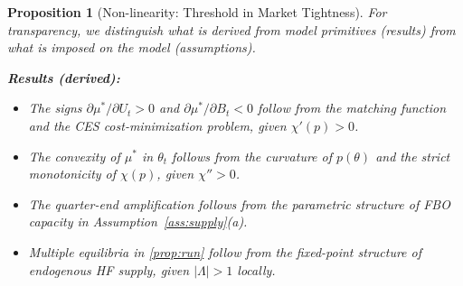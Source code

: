 \documentclass[12pt]{article}
\newtheorem{proposition}{Proposition}
\theoremstyle{definition}
\newcommand{\1}[1]{\mathds{1}\left[#1\right]}
\begin{document}
\begin{proposition}[Non-linearity: Threshold in Market Tightness]
For transparency, we distinguish what is derived from model primitives (results)
from what is imposed on the model (assumptions).

\medskip

\noindent\textbf{Results (derived):}
\begin{itemize}[noitemsep]
  \item The signs $\partial\mu^*/\partial U_t > 0$ and $\partial\mu^*/\partial
        B_t < 0$ follow from the matching function and the CES cost-minimization
        problem, given $\chi'(p) > 0$.
  \item The convexity of $\mu^*$ in $\theta_t$ follows from the curvature of
        $p(\theta)$ and the strict monotonicity of $\chi(p)$, given $\chi'' > 0$.
  \item The quarter-end amplification follows from the parametric structure of
        FBO capacity in Assumption~\ref{ass:supply}(a).
  \item Multiple equilibria in \cref{prop:run} follow from the fixed-point
        structure of endogenous HF supply, given $|\Lambda| > 1$ locally.
\end{itemize}


\end{proposition}
\end{document}
